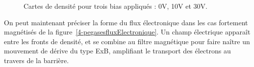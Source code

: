 \begin{refsection}
	\begin{figure}[!htbp]
  \centering
    \caption{Cartes de densité pour
    trois bias appliqués : 0V,
    10V et
    30V.}
    \label{4-PegasesCarteDensiteVarBiasWave}
\end{figure}

On peut maintenant préciser la forme du flux électronique 
dans les cas fortement magnétisés de la
figure~\ref{4-pegasesfluxElectronique}. Un champ électrique apparaît
entre les fronts de densité, et se combine au filtre
magnétique pour faire naître un mouvement de dérive du type ExB, amplifiant le
transport des électrons au travers de la barrière. 


\end{refsection}
